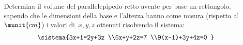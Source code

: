 \begin{esercizio}
 \label{ese:22.63}
Determina il volume del parallelepipedo retto avente
per base un rettangolo, sapendo che le dimensioni della base e
l'altezza hanno come misura (rispetto al~\(\munit{cm}\)) i valori
di~\(x, y, z\) ottenuti risolvendo il sistema:
\[\sistema{3x+1=2y+3z \\6x+y+2z=7
\\9(x-1)+3y+4z=0 }\]
\end{esercizio}


% 
% 
% 
% 
% 
% 
% 
